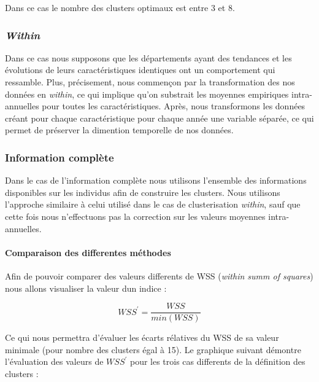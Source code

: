 \documentclass[11pt,]{article}
\let\oldparagraph\paragraph
\renewcommand{\paragraph}[1]{\oldparagraph{#1}\mbox{}}
\begin{document}
Dans ce cas le nombre des clusters optimaux est entre 3 et 8.

\hypertarget{within}{%
\subsubsection{\texorpdfstring{\emph{Within}}{Within}}\label{within}}

Dans ce cas nous supposons que les départements ayant des tendances et
les évolutions de leurs caractéristiques identiques ont un comportement
qui ressamble. Plus, précisement, nous commençon par la transformation
des nos données en \emph{within}, ce qui implique qu'on substrait les
moyennes empiriques intra-annuelles pour toutes les caractéristiques.
Après, nous transformons les données créant pour chaque caractéristique
pour chaque année une variable séparée, ce qui permet de préserver la
dimention temporelle de nos données.

\hypertarget{information-complete}{%
\subsubsection{Information complète}\label{information-complete}}

Dans le cas de l'information complète nous utilisons l'ensemble des
informations disponibles sur les individus afin de construire les
clusters. Nous utilisons l'approche similaire à celui utilisé dans le
cas de clusterisation \emph{within}, sauf que cette fois nous
n'effectuons pas la correction sur les valeurs moyennes intra-annuelles.

\hypertarget{comparaison-des-differentes-methodes}{%
\paragraph{Comparaison des differentes
méthodes}\label{comparaison-des-differentes-methodes}}

Afin de pouvoir comparer des valeurs differents de WSS (\emph{within
summ of squares}) nous allons visualiser la valeur dun indice :

\begin{equation*}
    WSS^{'} = \frac{WSS}{min(WSS)}
\end{equation*}

Ce qui nous permettra d'évaluer les écarts rélatives du WSS de sa valeur
minimale (pour nombre des clusters égal à 15). Le graphique suivant
démontre l'évaluation des valeurs de \(WSS^{'}\) pour les trois cas
differents de la définition des clusters :
\end{document}
